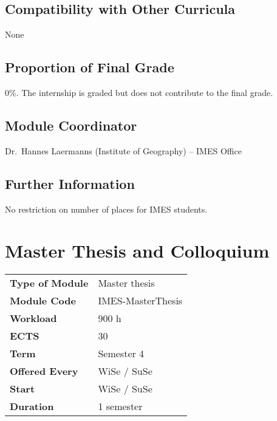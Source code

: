 \documentclass[
  letterpaper,
  10pt,
  openany]{book}
\begin{document}
\section*{Compatibility with Other
Curricula}\label{compatibility-with-other-curricula-4}


None

\section*{Proportion of Final Grade}\label{proportion-of-final-grade-4}


0\%. The internship is graded but does not contribute to the final
grade.

\section*{Module Coordinator}\label{module-coordinator-4}


Dr.~Hannes Laermanns (Institute of Geography) -- IMES Office

\section*{Further Information}\label{further-information-4}


No restriction on number of places for IMES students.

\chapter*{Master Thesis and
Colloquium}\label{master-thesis-and-colloquium}


\begin{longtable}[]{@{}ll@{}}
\toprule\noalign{}
\endhead
\bottomrule\noalign{}
\endlastfoot
\textbf{Type of Module} & Master thesis \\
\textbf{Module Code} & IMES-MasterThesis \\
\textbf{Workload} & 900 h \\
\textbf{ECTS} & 30 \\
\textbf{Term} & Semester 4 \\
\textbf{Offered Every} & WiSe / SuSe \\
\textbf{Start} & WiSe / SuSe \\
\textbf{Duration} & 1 semester \\
\end{longtable}
\end{document}
